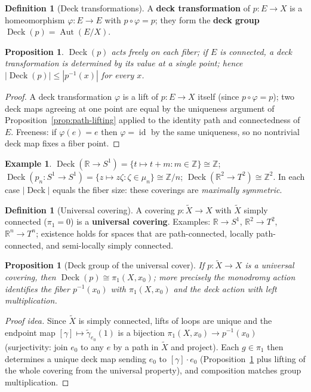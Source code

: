 \documentclass[11pt,a4paper]{article}
\newtheorem{proposition}[theorem]{Proposition}
\theoremstyle{definition}
\newtheorem{definition}[theorem]{Definition}
\newtheorem{example}[theorem]{Example}
\newcommand{\Z}{\mathbb{Z}}
\newcommand{\R}{\mathbb{R}}
\newcommand{\id}{\operatorname{id}}
\newcommand{\Deck}{\operatorname{Deck}}
\newcommand{\Aut}{\operatorname{Aut}}
\begin{document}
	\begin{definition}[Deck transformations]
		A \textbf{deck transformation} of $p:E\to X$ is a homeomorphism $\varphi:E\to E$ with
		$p\circ\varphi=p$; they form the \textbf{deck group} $\Deck(p)=\Aut(E/X)$.
	\end{definition}
	
	\begin{proposition}\label{prop:deck-free}
		$\Deck(p)$ acts freely on each fiber; if $E$ is connected, a deck transformation is determined by
		its value at a single point; hence $|\Deck(p)|\le|p^{-1}(x)|$ for every $x$.
	\end{proposition}
	\begin{proof}
		A deck transformation $\varphi$ is a lift of $p:E\to X$ itself (since $p\circ\varphi=p$); two deck
		maps agreeing at one point are equal by the uniqueness argument of
		Proposition~\ref{prop:path-lifting} applied to the identity path and connectedness of $E$. Freeness:
		if $\varphi(e)=e$ then $\varphi=\id$ by the same uniqueness, so no nontrivial deck map fixes a fiber
		point.
	\end{proof}
	
	\begin{example}
		$\Deck(\R\to S^1)=\{t\mapsto t+m:m\in\Z\}\cong\Z$; $\Deck(p_n:S^1\to S^1)=\{z\mapsto z\zeta:\zeta\in\mu_n\}\cong\Z/n$;
		$\Deck(\R^2\to T^2)\cong\Z^2$. In each case $|\Deck|$ equals the fiber size: these coverings are
		\emph{maximally symmetric}.
	\end{example}
	
	\begin{definition}[Universal covering]
		A covering $p:\tilde X\to X$ with $\tilde X$ simply connected ($\pi_1=0$) is a \textbf{universal
			covering}. Examples: $\R\to S^1$, $\R^2\to T^2$, $\R^n\to T^n$; existence holds for spaces that are
		path-connected, locally path-connected, and semi-locally simply connected.
	\end{definition}
	
	\begin{proposition}[Deck group of the universal cover]\label{prop:deck-universal}
		If $p:\tilde X\to X$ is a universal covering, then $\Deck(p)\cong\pi_1(X,x_0)$; more precisely the
		monodromy action identifies the fiber $p^{-1}(x_0)$ with $\pi_1(X,x_0)$ and the deck action with
		left multiplication.
	\end{proposition}
	\begin{proof}[Proof idea]
		Since $\tilde X$ is simply connected, lifts of loops are unique and the endpoint map
		$[\gamma]\mapsto\tilde\gamma_{e_0}(1)$ is a bijection $\pi_1(X,x_0)\to p^{-1}(x_0)$ (surjectivity:
		join $e_0$ to any $e$ by a path in $\tilde X$ and project). Each $g\in\pi_1$ then determines a unique
		deck map sending $e_0$ to $[\gamma]\cdot e_0$ (Proposition~\ref{prop:deck-free} plus lifting of the
		whole covering from the universal property), and composition matches group multiplication.
	\end{proof}
	
\end{document}
